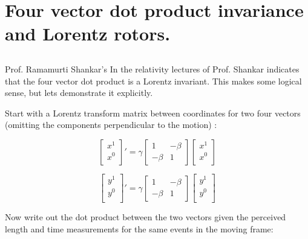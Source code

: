 \chapter{Four vector dot product invariance and Lorentz rotors.}
\label{chap:fourvecDotinvariance}
\date{August 1, 2008}        %
\section{}

Prof. Ramamurti Shankar's 
In the relativity lectures of
\citep{ShankarPhy200} Prof. Shankar
indicates that the
four vector dot product
is a Lorentz invariant.  This makes some logical sense, but lets demonstrate it explicitly.

Start with a Lorentz transform matrix between coordinates for two four vectors (omitting the components perpendicular  to the motion) :

\begin{equation*}
{
\begin{bmatrix}
x^1 \\
x^0 \\
\end{bmatrix}
}'
=
\gamma
\begin{bmatrix}
1 & -\beta \\
-\beta & 1
\end{bmatrix}
\begin{bmatrix}
x^1 \\
x^0 \\
\end{bmatrix}
\end{equation*}

\begin{equation*}
{
\begin{bmatrix}
y^1 \\
y^0 \\
\end{bmatrix}
}'
=
\gamma
\begin{bmatrix}
1 & -\beta \\
-\beta & 1
\end{bmatrix}
\begin{bmatrix}
y^1 \\
y^0 \\
\end{bmatrix}
\end{equation*}

Now write out the dot product between the two vectors given the perceived length and time measurements for the same events in the moving frame:

